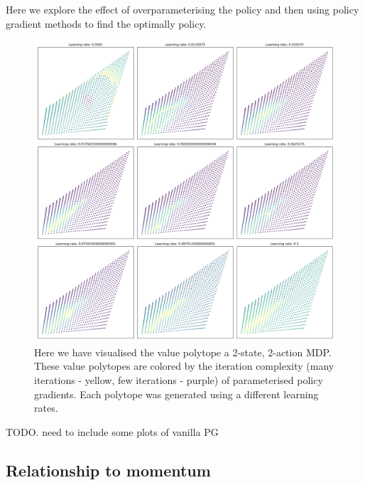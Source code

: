 Here we explore the effect of overparameterising the policy and then using
policy gradient methods to find the optimally policy.

\begin{figure}
\centering
\includegraphics[width=1.0\textwidth,height=1.0\textheight]{../../pictures/figures/iteration-lr-0.png}
\caption{Here we have visualised the value polytope a 2-state, 2-action MDP.
These value polytopes are colored by the iteration complexity (many iterations - yellow, few iterations - purple) of parameterised policy gradients.
Each polytope was generated using a different learning rates.}
\end{figure}



{\color{red}TODO. need to include some plots of vanilla PG}

\subsection{Relationship to momentum}

